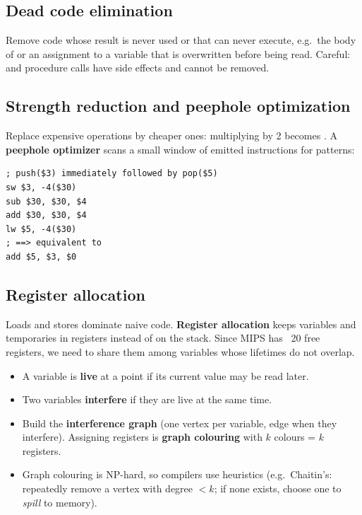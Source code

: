 \subsection{Dead code elimination}
Remove code whose result is never used or that can never execute, e.g.\ the body of
 or an assignment to a variable that is overwritten before being
read. Careful:  and procedure calls have side effects and cannot be removed.

\subsection{Strength reduction and peephole optimization}
Replace expensive operations by cheaper ones: multiplying by 2 becomes .
A \textbf{peephole optimizer} scans a small window of emitted instructions for patterns:
\begin{lstlisting}[style=mips]
; push($3) immediately followed by pop($5)
sw $3, -4($30)
sub $30, $30, $4
add $30, $30, $4
lw $5, -4($30)
; ==> equivalent to
add $5, $3, $0
\end{lstlisting}

\subsection{Register allocation}
Loads and stores dominate naive code. \textbf{Register allocation} keeps variables and
temporaries in registers instead of on the stack. Since MIPS has ~20 free registers, we
need to share them among variables whose lifetimes do not overlap.

\begin{itemize}
  \item A variable is \textbf{live} at a point if its current value may be read later.
  \item Two variables \textbf{interfere} if they are live at the same time.
  \item Build the \textbf{interference graph} (one vertex per variable, edge when they
        interfere). Assigning registers is \textbf{graph colouring} with $k$ colours = $k$
        registers.
  \item Graph colouring is NP-hard, so compilers use heuristics (e.g.\ Chaitin's: repeatedly
        remove a vertex with degree $<k$; if none exists, choose one to \emph{spill} to memory).
\end{itemize}

